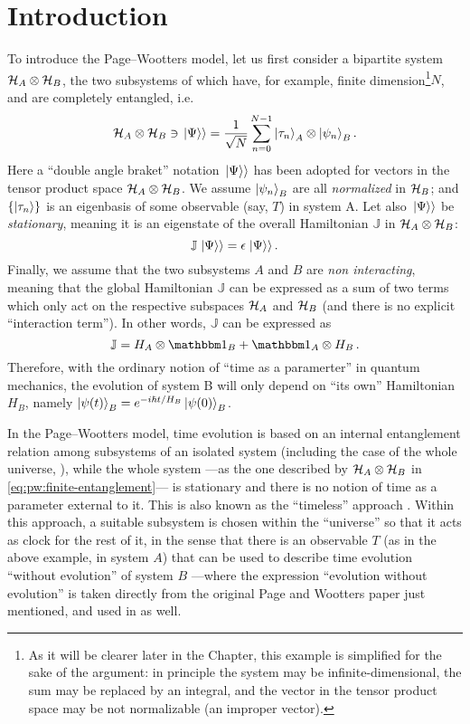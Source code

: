 \section{Introduction}

To introduce the Page--Wootters model, let us first consider
a bipartite system $\mathcal{H}_A \otimes \mathcal{H}_B$,
the two subsystems of which have, for example, finite dimension\footnote{
  As it will be clearer later in the Chapter,
  this example is simplified for the sake of the argument: in principle the system
  may be infinite-dimensional, the sum may be replaced by an integral, and
  the vector in the tensor product space may be not normalizable
  (an improper vector).
}$N$,
and are completely
entangled, i.e.
\begin{equation}\label{eq:pw:finite-entanglement}
  \mathcal{H}_A \otimes \mathcal{H}_B \ni \left.\left| \Psi \right\rangle\right\rangle
  =
  \frac{1}{\sqrt{N}} \sum_{n=0}^{N-1} \ket{\tau_{n}}_{A} \otimes \ket{\psi_{n}}_{B} \text{.}
\end{equation}
Here
a ``double angle braket'' notation $\left.\left| \Psi \right\rangle\right\rangle$ has been adopted
for vectors in the tensor product space $\mathcal{H}_A \otimes \mathcal{H}_B$.
We assume $\ket{\psi_{n}}_{B}$ are all \emph{normalized} in $\mathcal{H}_B$;
and
$\qty{\ket{{\tau}_n}}$ is an eigenbasis of some observable (say, $T$) in system A.
Let also $\left.\left| \Psi \right\rangle\right\rangle$ be \emph{stationary}, meaning it is an eigenstate
of the overall Hamiltonian $\mathbb{J}$ in $\mathcal{H}_A \otimes \mathcal{H}_B$:
$$
  \mathbb{J} \left.\left| \Psi \right\rangle\right\rangle = \epsilon \left.\left| \Psi \right\rangle\right\rangle \text{.}
$$
Finally, we assume that the two subsystems $A$ and $B$ are \emph{non interacting},
meaning that the global Hamiltonian $\mathbb{J}$ can be expressed as a sum of two terms
which only act on the respective subspaces $\mathcal{H}_A$ and $\mathcal{H}_B$
(and there is no explicit ``interaction term''). In other words,
$\mathbb{J}$ can be expressed as
$$
  \mathbb{J} = H_A \ox \idop_B + \idop_A \ox H_B \, \text{.} 
$$
Therefore, with the     ordinary notion of ``time as a paramerter'' in quantum mechanics,
the evolution of system B will only depend on ``its own'' Hamiltonian $H_B$, namely
$\ket{\psi(t)}_B = e^{- i \hbar t / H_B } \ket{\psi(0)}_B$. 

In the Page--Wootters model, time evolution is based on an internal entanglement
relation among subsystems of an isolated system (including the case of the whole universe,
\cite{PageWootters}), while the whole system
---as the one described by $\mathcal{H}_A \otimes \mathcal{H}_B$ in \eqref{eq:pw:finite-entanglement}---
is stationary and there is no notion
of time as a parameter external to it. This is also known as the
``timeless'' approach \parencite{Marletto:Evolution}.
\citereset
Within this approach,
a suitable subsystem is chosen within the ``universe'' so that it acts as
clock for the rest of it, in the sense that
there is an observable $T$ (as in the above example, in system $A$)
that can be used to
describe time evolution ``without evolution'' of system $B$
---where the expression ``evolution without evolution''
is taken directly from the original Page and Wootters paper just mentioned,
and used in \cite{Marletto:Evolution} as well.


